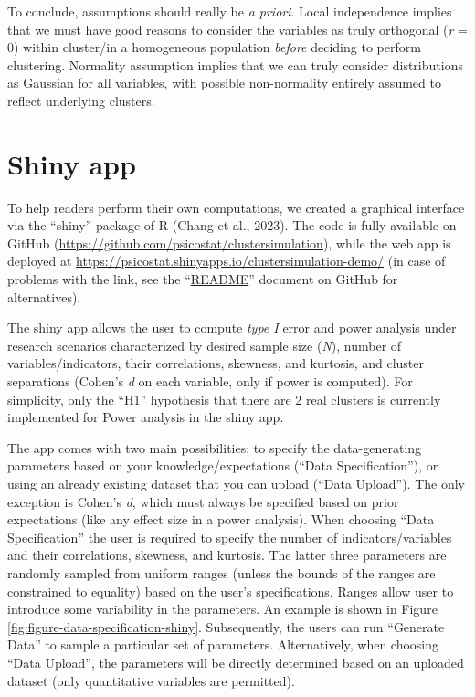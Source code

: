 \documentclass[
  man,floatsintext]{apa6}
\begin{document}
To conclude, assumptions should really be \emph{a priori}. Local independence implies that we must have good reasons to consider the variables as truly orthogonal (\emph{r} = 0) within cluster/in a homogeneous population \emph{before} deciding to perform clustering. Normality assumption implies that we can truly consider distributions as Gaussian for all variables, with possible non-normality entirely assumed to reflect underlying clusters.

\hypertarget{shiny-app}{%
\section{Shiny app}\label{shiny-app}}

To help readers perform their own computations, we created a graphical interface via the ``shiny'' package of R (Chang et al., 2023). The code is fully available on GitHub (\url{https://github.com/psicostat/clustersimulation}), while the web app is deployed at \url{https://psicostat.shinyapps.io/clustersimulation-demo/} (in case of problems with the link, see the ``\href{https://github.com/psicostat/clustersimulation\#readme}{README}'' document on GitHub for alternatives).

The shiny app allows the user to compute \emph{type I} error and power analysis under research scenarios characterized by desired sample size (\emph{N}), number of variables/indicators, their correlations, skewness, and kurtosis, and cluster separations (Cohen's \emph{d} on each variable, only if power is computed). For simplicity, only the ``H1'' hypothesis that there are 2 real clusters is currently implemented for Power analysis in the shiny app.

The app comes with two main possibilities: to specify the data-generating parameters based on your knowledge/expectations (``Data Specification''), or using an already existing dataset that you can upload (``Data Upload''). The only exception is Cohen's \emph{d}, which must always be specified based on prior expectations (like any effect size in a power analysis). When choosing ``Data Specification'' the user is required to specify the number of indicators/variables and their correlations, skewness, and kurtosis. The latter three parameters are randomly sampled from uniform ranges (unless the bounds of the ranges are constrained to equality) based on the user's specifications. Ranges allow user to introduce some variability in the parameters. An example is shown in Figure \ref{fig:figure-data-specification-shiny}. Subsequently, the users can run ``Generate Data'' to sample a particular set of parameters. Alternatively, when choosing ``Data Upload'', the parameters will be directly determined based on an uploaded dataset (only quantitative variables are permitted).
\end{document}
